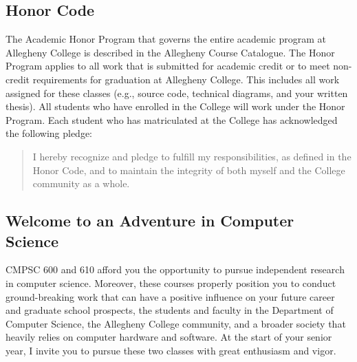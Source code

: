 \subsection*{Honor Code}

The Academic Honor Program that governs the entire academic program at Allegheny College is described in the Allegheny
Course Catalogue.  The Honor Program applies to all work that is submitted for academic credit or to meet non-credit
requirements for graduation at Allegheny College.  This includes all work assigned for these classes (e.g., source code,
technical diagrams, and your written thesis).  All students who have enrolled in the College will work under the Honor
Program.  Each student who has matriculated at the College has acknowledged the following pledge:

\vspace*{-.1in}
\begin{quote}
I hereby recognize and pledge to fulfill my responsibilities, as defined in the Honor Code, and to maintain the
integrity of both myself and the College community as a whole.
\end{quote}
\vspace*{-.15in}

\subsection*{Welcome to an Adventure in Computer Science}

CMPSC 600 and 610 afford you the opportunity to pursue independent research in computer science.  Moreover, these
courses properly position you to conduct ground-breaking work that can have a positive influence on your future career
and graduate school prospects, the students and faculty in the Department of Computer Science, the Allegheny College
community, and a broader society that heavily relies on computer hardware and software.  At the start of your senior
year, I invite you to pursue these two classes with great enthusiasm and vigor.

%


